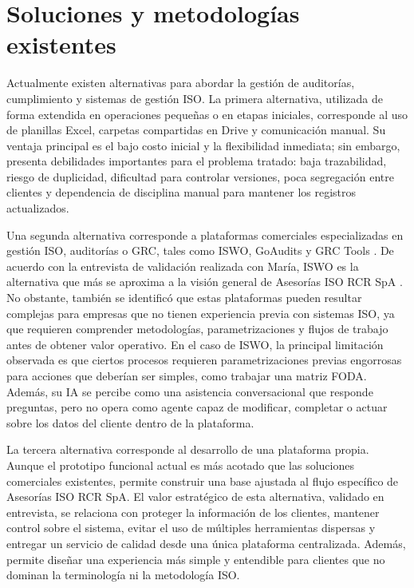 \documentclass[final]{udpthesis}
\begin{document}
\section{Soluciones y metodologías existentes}

Actualmente existen alternativas para abordar la gestión de auditorías, cumplimiento y sistemas de gestión ISO. La primera alternativa, utilizada de forma extendida en operaciones pequeñas o en etapas iniciales, corresponde al uso de planillas Excel, carpetas compartidas en Drive y comunicación manual. Su ventaja principal es el bajo costo inicial y la flexibilidad inmediata; sin embargo, presenta debilidades importantes para el problema tratado: baja trazabilidad, riesgo de duplicidad, dificultad para controlar versiones, poca segregación entre clientes y dependencia de disciplina manual para mantener los registros actualizados.

Una segunda alternativa corresponde a plataformas comerciales especializadas en gestión ISO, auditorías o GRC, tales como ISWO, GoAudits y GRC Tools \cite{iswo,goaudits,grctools}. De acuerdo con la entrevista de validación realizada con María, ISWO es la alternativa que más se aproxima a la visión general de Asesorías ISO RCR SpA \cite{entrevista-maria}. No obstante, también se identificó que estas plataformas pueden resultar complejas para empresas que no tienen experiencia previa con sistemas ISO, ya que requieren comprender metodologías, parametrizaciones y flujos de trabajo antes de obtener valor operativo. En el caso de ISWO, la principal limitación observada es que ciertos procesos requieren parametrizaciones previas engorrosas para acciones que deberían ser simples, como trabajar una matriz FODA. Además, su IA se percibe como una asistencia conversacional que responde preguntas, pero no opera como agente capaz de modificar, completar o actuar sobre los datos del cliente dentro de la plataforma.

La tercera alternativa corresponde al desarrollo de una plataforma propia. Aunque el prototipo funcional actual es más acotado que las soluciones comerciales existentes, permite construir una base ajustada al flujo específico de Asesorías ISO RCR SpA. El valor estratégico de esta alternativa, validado en entrevista, se relaciona con proteger la información de los clientes, mantener control sobre el sistema, evitar el uso de múltiples herramientas dispersas y entregar un servicio de calidad desde una única plataforma centralizada. Además, permite diseñar una experiencia más simple y entendible para clientes que no dominan la terminología ni la metodología ISO.
\end{document}
